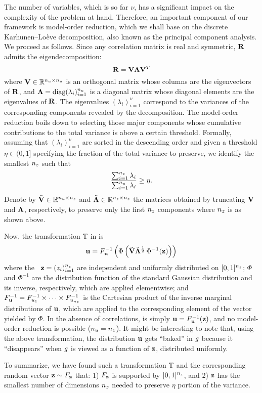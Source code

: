 The number of variables, which is so far $\nu$, has a significant impact on the
complexity of the problem at hand. Therefore, an important component of our
framework is model-order reduction, which we shall base on the discrete
Karhunen--Lo\`{e}ve decomposition, also known as the principal component
analysis. We proceed as follows. Since any correlation matrix is real and
symmetric, $\mathbf{R}$ admits the eigendecomposition:
\[
  \mathbf{R} = \mathbf{V} \mathbf{\Lambda} \mathbf{V}^T
\]
where $\mathbf{V} \in \mathbb{R}^{{n_u} \times {n_u}}$ is an orthogonal matrix whose columns
are the eigenvectors of $\mathbf{R}$, and $\mathbf{\Lambda} = \text{diag}(\lambda_i)_{i =
1}^{n_u}$ is a diagonal matrix whose diagonal elements are the eigenvalues of
$\mathbf{R}$. The eigenvalues $(\lambda_i)_{i = 1}^\nu$ correspond to the
variances of the corresponding components revealed by the decomposition. The
model-order reduction boils down to selecting those major components whose
cumulative contributions to the total variance is above a certain threshold.
Formally, assuming that $(\lambda_i)_{i = 1}^\nu$ are sorted in the descending
order and given a threshold $\eta \in (0, 1]$ specifying the fraction of the
total variance to preserve, we identify the smallest ${n_z}$ such that
\begin{equation} \elab{reduction}
  \frac{\sum_{i = 1}^\nz \lambda_i}{\sum_{i = 1}^\nu \lambda_i} \geq \eta.
\end{equation}
Denote by $\tilde{\mathbf{V}} \in \mathbb{R}^{{n_u} \times {n_z}}$ and $\tilde{\mathbf{\Lambda}}
\in\mathbb{R}^{{n_z} \times {n_z}}$ the matrices obtained by truncating $\mathbf{V}$ and
$\mathbf{\Lambda}$, respectively, to preserve only the first ${n_z}$ components where
${n_z}$ is as shown above.

Now, the transformation $\mathbb{T}$ in  is
\begin{equation} \elab{transformation-concrete}
  \vu = \distribution_\vu^{-1} \left( \Phi\left( \tilde{\m{V}} \tilde{\m{\Lambda}}^\frac{1}{2} \, \Phi^{-1}(\vz) \right) \right)
\end{equation}
where the \rvs\ $\mathbf{z} = (z_i)_{i = 1}^{n_z}$ are independent and uniformly
distributed on $[0, 1]^{n_z}$; $\Phi$ and $\Phi^{-1}$ are the distribution
function of the standard Gaussian distribution and its inverse, respectively,
which are applied elementwise; and $F_{\mathbf{u}}^{-1} =
F_{u_1}^{-1} \times \cdots \times F_{u_{n_z}}^{-1}$ is
the Cartesian product of the inverse marginal distributions of $\mathbf{u}$, which are
applied to the corresponding element of the vector yielded by $\Phi$. In the
absence of correlations,  is simply $\mathbf{u} =
F_{\mathbf{u}}^{-1}(\mathbf{z})$, and no model-order reduction is possible (${n_u} =
{n_z}$). It might be interesting to note that, using the above transformation, the
distribution $\mathbf{u}$ gets ``baked'' in $g$ because it ``disappears'' when $g$ is
viewed as a function of $\mathbf{z}$, distributed uniformly.

To summarize, we have found such a transformation $\mathbb{T}$ and the
corresponding random vector $\mathbf{z} \sim F_{\mathbf{z}}$ that: 1)
$F_{\mathbf{z}}$ is supported by $[0, 1]^{n_z}$, and 2) $\mathbf{z}$ has the smallest
number of dimensions ${n_z}$ needed to preserve $\eta$ portion of the variance.
